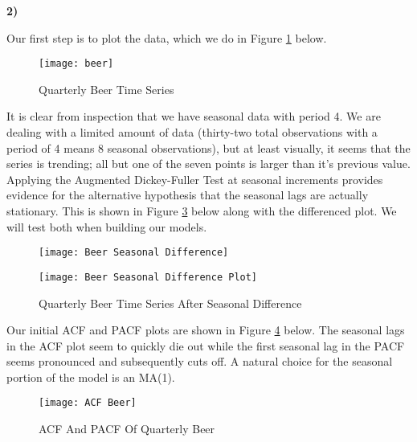 \documentclass[12pt, letterpaper]{article}
\theoremstyle{definition}
\numberwithin{equation}{section}
\newcommand{\+}[1]{+_{\scalebox{.375}{#1}}}
\newcommand{\1}{\mathbbm{1}}
\begin{document}
\newpage
\noindent\textbf{2) }

\vspace{\baselineskip}
\noindent\textbf{}
\vspace{\baselineskip}

Our first step is to plot the data, which we do in Figure \ref{beer} below.

\vspace{-0.35cm}
\begin{figure}[H]
	\centering
	\texttt{[image: beer]}
	\caption{Quarterly Beer Time Series}
	\label{beer}
\end{figure}


It is clear from inspection that we have seasonal data with period 4. We are dealing with a limited amount of data (thirty-two total observations with a period of 4 means 8 seasonal observations), but at least visually, it seems that the series is trending; all but one of the seven points is larger than it's previous value. Applying the Augmented Dickey-Fuller Test at seasonal increments provides evidence for the alternative hypothesis that the seasonal lags are actually stationary. This is shown in Figure \ref{Beer Seasonal Difference Plot} below along with the differenced plot. We will test both when building our models.

\begin{figure}[H]
	\centering
	\texttt{[image: Beer Seasonal Difference]}
	\label{Beer Seasonal Difference}
\end{figure}
\vspace{-0.5cm}
\begin{figure}[H]
	\centering
	\texttt{[image: Beer Seasonal Difference Plot]}
	\caption{Quarterly Beer Time Series After Seasonal Difference}
	\label{Beer Seasonal Difference Plot}
\end{figure}


\newpage
Our initial ACF and PACF plots are shown in Figure \ref{ACF Beer} below. The seasonal lags in the ACF plot seem to quickly die out while the first seasonal lag in the PACF seems pronounced and subsequently cuts off. A natural choice for the seasonal portion of the model is an MA(1).
\begin{figure}[H]
	\centering
	\texttt{[image: ACF Beer]}
	\caption{ACF And PACF Of Quarterly Beer}
	\label{ACF Beer}
\end{figure}
\end{document}
